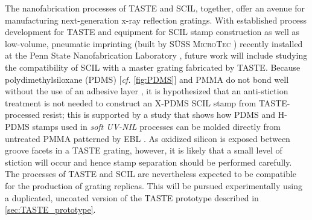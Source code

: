 
The nanofabrication processes of TASTE and SCIL, together, offer an avenue for manufacturing next-generation x-ray reflection gratings. 
With established process development for TASTE and equipment for SCIL stamp construction as well as low-volume, pneumatic imprinting (built by \textsc{S{\"U}SS MicroTec} \cite{suss_microtec}) recently installed at the Penn State Nanofabrication Laboratory \cite{PSU_MRI_nanofab}, future work will include studying the compatibility of SCIL with a master grating fabricated by TASTE.  %
Because polydimethylsiloxane (PDMS) [\emph{cf.\@} \cref{fig:PDMS}] and PMMA do not bond well without the use of an adhesive layer \cite{Tan10}, it is hypothesized that an anti-stiction treatment is not needed to construct an X-PDMS SCIL stamp from TASTE-processed resist; this is supported by a study that shows how PDMS and H-PDMS stamps used in \emph{soft UV-NIL} processes can be molded directly from untreated PMMA patterned by EBL \cite{Huelsen14}. As oxidized silicon is exposed between groove facets in a TASTE grating, however, it is likely that a small level of stiction will occur and hence stamp separation should be performed carefully.
The processes of TASTE and SCIL are nevertheless expected to be compatible for the production of grating replicas. 
This will be pursued experimentally using a duplicated, uncoated version of the TASTE prototype described in \cref{sec:TASTE_prototype}. 

